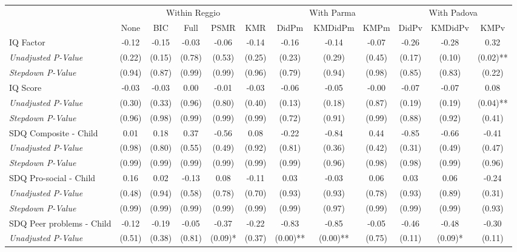 \begin{tabular}{l c c c c c c c c c c c}
\toprule
& \multicolumn{5}{c}{Within Reggio} & \multicolumn{3}{c}{With Parma} & \multicolumn{3}{c}{With Padova} \\\cmidrule(lr){2-6} \cmidrule(lr){7-9} \cmidrule(lr){10-12}
 & None & BIC & Full & PSMR & KMR & DidPm & KMDidPm & KMPm & DidPv & KMDidPv & KMPv \\
\midrule
IQ Factor & -0.12 & -0.15 & -0.03 & -0.06 & -0.14 & -0.16 & -0.14 & -0.07 & -0.26 & -0.28 & 0.32 \\
\quad \textit{Unadjusted P-Value} & (0.22) & (0.15) & (0.78) & (0.53) & (0.25) & (0.23) & (0.29) & (0.45) & (0.17) & (0.10) & (0.02)** \\
\quad \textit{Stepdown P-Value} & (0.94) & (0.87) & (0.99) & (0.99) & (0.96) & (0.79) & (0.94) & (0.98) & (0.85) & (0.83) & (0.22) \\
IQ Score & -0.03 & -0.03 & 0.00 & -0.01 & -0.03 & -0.06 & -0.05 & -0.00 & -0.07 & -0.07 & 0.08 \\
\quad \textit{Unadjusted P-Value} & (0.30) & (0.33) & (0.96) & (0.80) & (0.40) & (0.13) & (0.18) & (0.87) & (0.19) & (0.19) & (0.04)** \\
\quad \textit{Stepdown P-Value} & (0.96) & (0.98) & (0.99) & (0.99) & (0.99) & (0.72) & (0.91) & (0.99) & (0.88) & (0.92) & (0.41) \\
SDQ Composite - Child & 0.01 & 0.18 & 0.37 & -0.56 & 0.08 & -0.22 & -0.84 & 0.44 & -0.85 & -0.66 & -0.41 \\
\quad \textit{Unadjusted P-Value} & (0.98) & (0.80) & (0.55) & (0.49) & (0.92) & (0.81) & (0.36) & (0.42) & (0.31) & (0.49) & (0.47) \\
\quad \textit{Stepdown P-Value} & (0.99) & (0.99) & (0.99) & (0.99) & (0.99) & (0.99) & (0.96) & (0.98) & (0.98) & (0.99) & (0.96) \\
SDQ Pro-social - Child & 0.16 & 0.02 & -0.13 & 0.08 & -0.11 & 0.03 & -0.03 & 0.06 & 0.03 & 0.06 & -0.24 \\
\quad \textit{Unadjusted P-Value} & (0.48) & (0.94) & (0.58) & (0.78) & (0.70) & (0.93) & (0.93) & (0.78) & (0.93) & (0.89) & (0.31) \\
\quad \textit{Stepdown P-Value} & (0.99) & (0.99) & (0.99) & (0.99) & (0.99) & (0.99) & (0.97) & (0.99) & (0.99) & (0.99) & (0.93) \\
SDQ Peer problems - Child & -0.12 & -0.19 & -0.05 & -0.37 & -0.22 & -0.83 & -0.85 & -0.05 & -0.46 & -0.48 & -0.30 \\
\quad \textit{Unadjusted P-Value} & (0.51) & (0.38) & (0.81) & (0.09)* & (0.37) & (0.00)** & (0.00)** & (0.75) & (0.11) & (0.09)* & (0.11) \\

\end{tabular}

